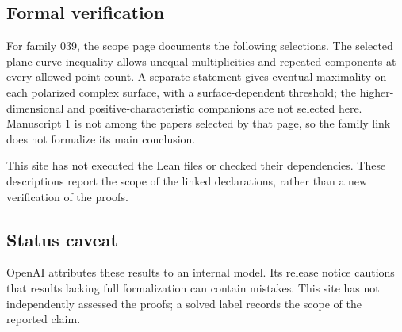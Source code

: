 \documentclass[11pt]{article}
\begin{document}
\subsection{Formal verification}
For family 039, the scope page documents the following selections. The selected plane-curve inequality allows unequal multiplicities and repeated components at every allowed point count. A separate statement gives eventual maximality on each polarized complex surface, with a surface-dependent threshold; the higher-dimensional and positive-characteristic companions are not selected here. Manuscript 1 is not among the papers selected by that page, so the family link does not formalize its main conclusion.

This site has not executed the Lean files or checked their dependencies. These descriptions report the scope of the linked declarations, rather than a new verification of the proofs.

\subsection{Status caveat}
OpenAI attributes these results to an internal model. Its release notice cautions that results lacking full formalization can contain mistakes. This site has not independently assessed the proofs; a solved label records the scope of the reported claim.
\end{document}
